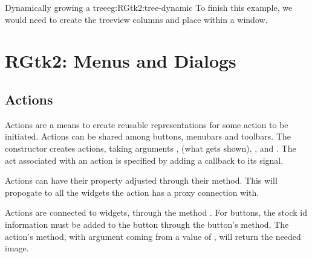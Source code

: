 \begin{example}{Dynamically growing a tree}{eg:RGtk2:tree-dynamic}
To finish this example, we would need to create the treeview columns
and place within a window. 




\end{example}






\chapter{RGtk2: Menus and Dialogs}
\label{sec:RGtk2-menus}

\section{Actions}
\label{sec:RGtk2:actions}

Actions are a means to create reusable representations for some action
to be initiated. Actions can be shared among buttons, menubars and
toolbars. The  constructor creates actions,
taking arguments ,
 (what gets shown),
, and .
The act associated with an action is specified by adding a callback to
its  signal.

Actions can have their  property adjusted through
their  method. This will propogate to
all the widgets the action has a proxy connection with.

Actions are connected to widgets, through the method
. For buttons, the stock id
information must be added to the button through the button's
 method. The action's 
method, with argument coming from a value of , will
return the needed image.


